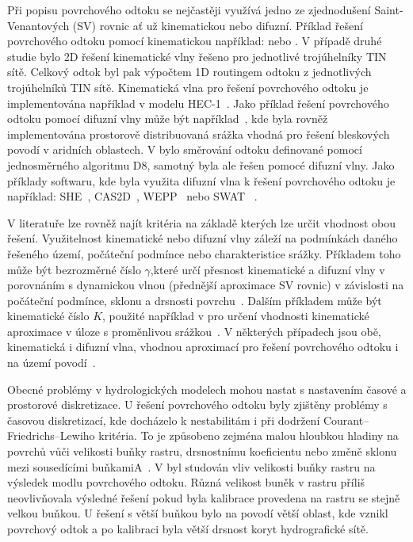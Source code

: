 Při popisu povrchového odtoku se nejčastěji využívá jedno ze zjednodušení Saint-Venantových (SV) rovnic ať už kinematickou nebo difuzní. 
Příklad řešení povrchového odtoku pomocí kinematickou například: \cite{taylor1974} nebo \cite{goodrich1991}. V případě druhé studie bylo 2D řešení kinematické vlny řešeno pro jednotlivé trojúhelníky TIN sítě. Celkový odtok byl pak výpočtem 1D routingem odtoku z jednotlivých trojúhelníků TIN sítě. Kinematická vlna pro řešení povrchového odtoku je implementována například v modelu HEC-1~\citep{macarthur1993}. Jako příklad řešení povrchového odtoku pomocí difuzní vlny může být například~\cite{julien1995}, kde byla rovněž implementována prostorově distribuovaná srážka vhodná pro řešení bleskových povodí v aridních oblastech. V \cite{jain2004} bylo směrování odtoku definované pomocí jednosměrného algoritmu D8, samotný byla ale řešen pomocé difuzní vlny. Jako příklady softwaru, kde byla využita difuzní vlna k řešení povrchového odtoku je například: SHE~\cite{abbott1986_1, abbott1986_2}, CAS2D~\cite{julien1995}, WEPP~\citep{flanagan2010} nebo SWAT ~\citep{USDA}. 

V literatuře lze rovněž najít kritéria na základě kterých lze určit vhodnost obou řešení. Využitelnost kinematické nebo difuzní vlny záleží na podmínkách daného řešeného území, počáteční podmínce nebo charakteristice srážky. Příkladem toho může být bezrozměrné číslo $\gamma$,které určí přesnost kinematické a difuzní vlny v porovnáním s dynamickou vlnou (přednější aproximace SV rovnic) v závislosti na počáteční podmínce, sklonu a drsnosti povrchu~\cite{singh1994}. Dalším příkladem může být kinematické číslo $K$, použité například v pro určení vhodnosti kinematické aproximace v úloze s proměnlivou srážkou~\citep{moramarco2002}. V některých případech jsou obě, kinematická i difuzní vlna, vhodnou aproximací pro řešení povrchového odtoku i na území povodí~\citep{Kazezyilmaz-Alhan2007}.

Obecné problémy v hydrologických modelech mohou nastat s nastavením časové a prostorové diskretizace.  U řešení povrchového odtoku byly zjištěny problémy s časovou diskretizací, kde docházelo k nestabilitám i při dodržení Courant–Friedrichs–Lewiho kritéria. To je způsobeno zejména malou hloubkou hladiny na povrchů vůči velikosti buňky rastru, drsnostnímu koeficientu nebo změně sklonu mezi sousedícími buňkamiA~\cite{zhang1989, esteves2000}. V \cite{molnar2000} byl studován vliv velikosti buňky rastru na výsledek modlu povrchového odtoku. Různá velikost buněk v rastru příliš neovlivňovala výsledné řešení pokud byla kalibrace provedena na rastru se stejně velkou buňkou. U řešení s větší buňkou bylo na povodí větší oblast, kde vznikl povrchový odtok a po kalibraci byla větší drsnost koryt hydrografické sítě.



